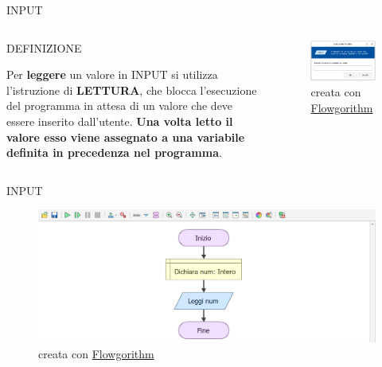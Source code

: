 \documentclass[aspectratio=1610, handout]{beamer}
\begin{document}
\begin{frame}{INPUT}
    \begin{columns}
            \begin{alertblock}{DEFINIZIONE}
                \begin{minipage}{0.96\linewidth}
                    \justifying
                    Per \textbf{leggere} un valore in INPUT si utilizza l’istruzione di 
                    \textbf{LETTURA}, che blocca l’esecuzione del programma in attesa di un valore che 
                    deve essere inserito dall'utente. \textbf{Una volta letto il valore esso viene assegnato a una 
                    variabile definita in precedenza nel programma}.
                \end{minipage}
            \end{alertblock}
            \begin{figure}
                \includegraphics[width=\linewidth]{img/input.png}
                \caption{{creata con \href{http://www.flowgorithm.org/}{Flowgorithm}}}
            \end{figure}
    \end{columns}
\end{frame}

\begin{frame}{INPUT}
    \begin{figure}
        \includegraphics[width=\linewidth]{img/input2.png}
        \caption{{creata con \href{http://www.flowgorithm.org/}{Flowgorithm}}}
    \end{figure}
\end{frame}
\end{document}
